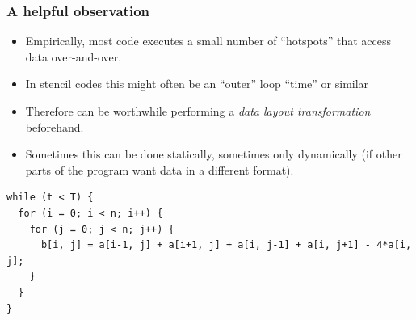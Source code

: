 \documentclass[presentation,aspectratio=43,10pt]{beamer}
\begin{document}
\begin{frame}
\begin{center}

  \end{center}
\end{frame}

\begin{frame}[fragile]
  \frametitle{A helpful observation}
  \begin{itemize}
  \item Empirically, most code executes a small number of ``hotspots''
    that access data over-and-over.
  \item In stencil codes this might often be an ``outer'' loop
    ``time'' or similar
  \item Therefore can be worthwhile performing a \emph{data layout
      transformation} beforehand.
  \item Sometimes this can be done statically, sometimes only
    dynamically (if other parts of the program want data in a
    different format).
  \end{itemize}
\begin{verbatim}
while (t < T) {
  for (i = 0; i < n; i++) {
    for (j = 0; j < n; j++) {
      b[i, j] = a[i-1, j] + a[i+1, j] + a[i, j-1] + a[i, j+1] - 4*a[i, j];
    }
  }
}
\end{verbatim}
\end{frame}
\end{document}
